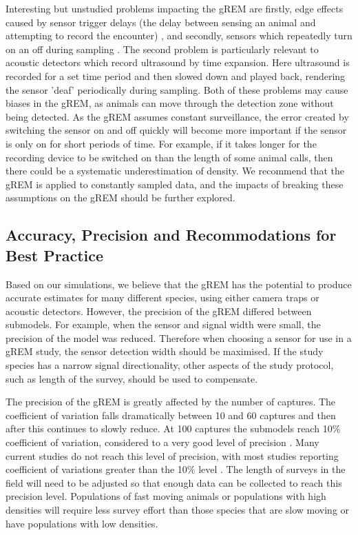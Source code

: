 \documentclass[a4paper,10pt,reqno,oneside]{amsart}
\begin{document}
Interesting but unstudied problems impacting the gREM are firstly, edge effects caused by sensor trigger delays (the delay between sensing an animal and attempting to record the encounter) \citep{rovero2013camera}, and secondly, sensors which repeatedly turn on an off during sampling \citep{jones2011indicator}. The second problem is particularly relevant to acoustic detectors which record ultrasound by time expansion. Here ultrasound is recorded for a set time period and then slowed down and played back, rendering the sensor 'deaf' periodically during sampling. 
Both of these problems may cause biases in the gREM, as animals can move through the detection zone without being detected. As the gREM assumes constant surveillance, the error created by switching the sensor on and off quickly will become more important if the sensor is only on for short periods of time. For example, if it takes longer for the recording device to be switched on than the length of some animal calls, then there could be a systematic underestimation of density. We recommend that the gREM is applied to constantly sampled data, and the impacts of breaking these assumptions on the gREM should be further explored. 

\subsection*{Accuracy, Precision and Recommodations for Best Practice}
Based on our simulations, we believe that the gREM has the potential to produce accurate estimates for many different species, using either camera traps or acoustic detectors. However, the precision of the gREM differed between submodels. For example, when the sensor and signal width were small, the precision of the model was reduced. Therefore when choosing a sensor for use in a gREM study, the sensor detection width should be maximised. If the study species has a narrow signal directionality, other aspects of the study protocol, such as length of the survey, should be used to compensate. 

The precision of the gREM is greatly affected by the number of captures. The coefficient of variation falls dramatically between 10 and 60 captures and then after this continues to slowly reduce. At 100 captures the submodels reach 10\% coefficient of variation, considered to a very good level of precision \citep{thomas2012passive}. Many current studies do not reach this level of precision, with most studies reporting coefficient of variations greater than the 10\% level \citep{o2003crouching, proctor2010ecological, foster2012critique}. The length of surveys in the field will need to be adjusted so that enough data can be collected to reach this precision level. Populations of fast moving animals or populations with high densities will require less survey effort than those species that are slow moving or have populations with low densities. 
\end{document}
